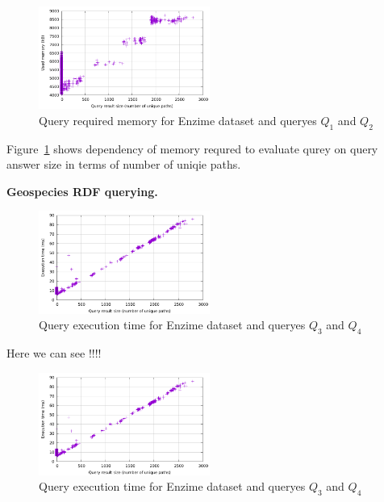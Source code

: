 \begin{figure}[ht]
  \begin{center}
    \includegraphics[width=0.5\textwidth]{data/enzime_narrowerTr_mem_per_paths.pdf}
    \caption{Query required memory for Enzime dataset and queryes $Q_1$ and $Q_2$}
    \label{fig:enzime_mem_per_paths}
  \end{center}
\end{figure}

Figure~\ref{fig:enzime_mem_per_paths} shows dependency of memory requred to evaluate qurey on query answer size in terms of number of uniqie paths.


\textbf{Geospecies RDF querying.}

\begin{figure}[ht]
  \begin{center}
    \includegraphics[width=0.5\textwidth]{data/enzime_narrowerTr_time_per_paths.pdf}
    \caption{Query execution time for Enzime dataset and queryes $Q_3$ and $Q_4$}
    \label{fig:geo_time_per_paths}
  \end{center}
\end{figure}

Here we can see !!!!

\begin{figure}[ht]
  \begin{center}
    \includegraphics[width=0.5\textwidth]{data/enzime_narrowerTr_time_per_paths.pdf}
    \caption{Query execution time for Enzime dataset and queryes $Q_3$ and $Q_4$}
    \label{fig:geo_time_per_paths}
  \end{center}
\end{figure}

